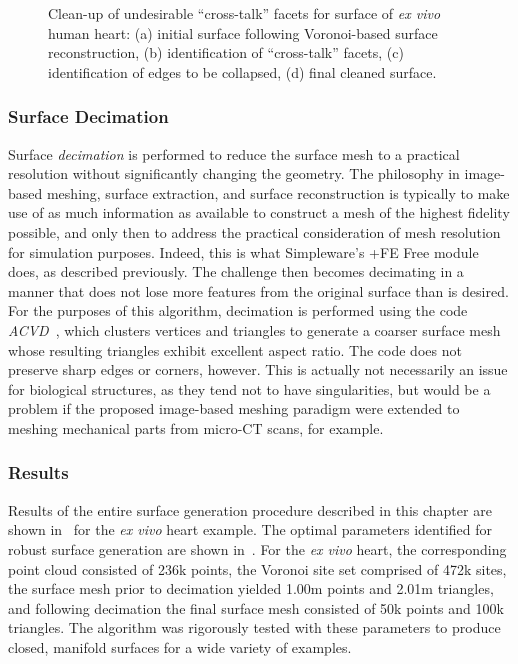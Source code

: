 \begin{figure}
{\label{fig:cross2-4}}		
%
\caption{Clean-up of undesirable ``cross-talk'' facets for surface of \textit{ex vivo} human heart: (a) initial surface following Voronoi-based surface reconstruction, (b) identification of ``cross-talk'' facets, (c) identification of edges to be collapsed, (d) final cleaned surface.}
\label{fig:cross2}
\end{figure}

\subsubsection{Surface Decimation}

Surface \textit{decimation} is performed to reduce the surface mesh to a practical resolution without significantly changing the geometry. The philosophy in image-based meshing, surface extraction, and surface reconstruction is typically to make use of as much information as available to construct a mesh of the highest fidelity possible, and only then to address the practical consideration of mesh resolution for simulation purposes. Indeed, this is what Simpleware's {+FE Free} module does, as described previously. The challenge then becomes decimating in a manner that does not lose more features from the original surface than is desired. For the purposes of this algorithm, decimation is performed using the code \textit{ACVD}~\cite{valette_2004, valette_2008}, which clusters vertices and triangles to generate a coarser surface mesh whose resulting triangles exhibit excellent aspect ratio. The code does not preserve sharp edges or corners, however. This is actually not necessarily an issue for biological structures, as they tend not to have singularities, but would be a problem if the proposed image-based meshing paradigm were extended to meshing mechanical parts from micro-CT scans, for example.

\subsubsection{Results}

Results of the entire surface generation procedure described in this chapter are shown in~ for the \textit{ex vivo} heart example. The optimal parameters identified for robust surface generation are shown in~. For the \textit{ex vivo} heart, the corresponding point cloud consisted of 236k points, the Voronoi site set comprised of 472k sites, the surface mesh prior to decimation yielded 1.00m points and 2.01m triangles, and following decimation the final surface mesh consisted of 50k points and 100k triangles. The algorithm was rigorously tested with these parameters to produce closed, manifold surfaces for a wide variety of examples.

